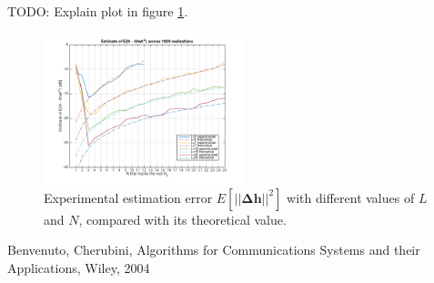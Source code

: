\documentclass[10pt]{article}
\numberwithin{equation}{section}
\begin{document}
TODO: Explain plot in figure \ref{fig:p02_comparetheoreticaldeltah}.

\begin{figure}[ht]
	\centering
	\includegraphics[width=0.52\textwidth]{p02_comparetheoreticaldeltah}
	\caption{Experimental estimation error $E[||\mathbf{\Delta h}||^2]$ with different values of $L$ and $N$, compared with its theoretical value.}
    \label{fig:p02_comparetheoreticaldeltah}
\end{figure}


\begin{thebibliography}{10}

Benvenuto, Cherubini, Algorithms for Communications Systems and their Applications, Wiley, 2004


\end{thebibliography}
\end{document}
